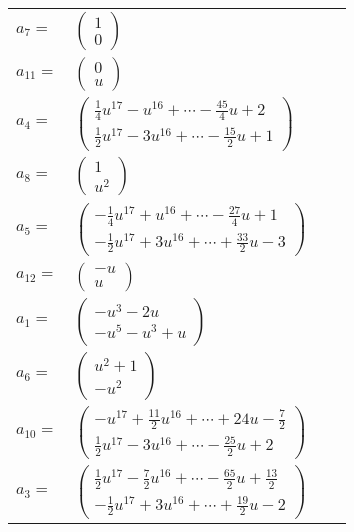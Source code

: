 \documentclass[1p]{elsarticle_modified}
\theoremstyle{definition}
\begin{document}
\begin{tabular}{m{7pt} m{180pt} m{7pt} m{180pt} }
\flushright $a_{7}=$&$\begin{pmatrix}1\\0\end{pmatrix}$ \\
\flushright $a_{11}=$&$\begin{pmatrix}0\\u\end{pmatrix}$ \\
\flushright $a_{4}=$&$\begin{pmatrix}\frac{1}{4} u^{17}- u^{16}+\cdots-\frac{45}{4} u+2\\\frac{1}{2} u^{17}-3 u^{16}+\cdots-\frac{15}{2} u+1\end{pmatrix}$ \\
\flushright $a_{8}=$&$\begin{pmatrix}1\\u^2\end{pmatrix}$ \\
\flushright $a_{5}=$&$\begin{pmatrix}-\frac{1}{4} u^{17}+u^{16}+\cdots-\frac{27}{4} u+1\\-\frac{1}{2} u^{17}+3 u^{16}+\cdots+\frac{33}{2} u-3\end{pmatrix}$ \\
\flushright $a_{12}=$&$\begin{pmatrix}- u\\u\end{pmatrix}$ \\
\flushright $a_{1}=$&$\begin{pmatrix}- u^3-2 u\\- u^5- u^3+u\end{pmatrix}$ \\
\flushright $a_{6}=$&$\begin{pmatrix}u^2+1\\- u^2\end{pmatrix}$ \\
\flushright $a_{10}=$&$\begin{pmatrix}- u^{17}+\frac{11}{2} u^{16}+\cdots+24 u-\frac{7}{2}\\\frac{1}{2} u^{17}-3 u^{16}+\cdots-\frac{25}{2} u+2\end{pmatrix}$ \\
\flushright $a_{3}=$&$\begin{pmatrix}\frac{1}{2} u^{17}-\frac{7}{2} u^{16}+\cdots-\frac{65}{2} u+\frac{13}{2}\\-\frac{1}{2} u^{17}+3 u^{16}+\cdots+\frac{19}{2} u-2\end{pmatrix}$ \\

\end{tabular}
\end{document}
